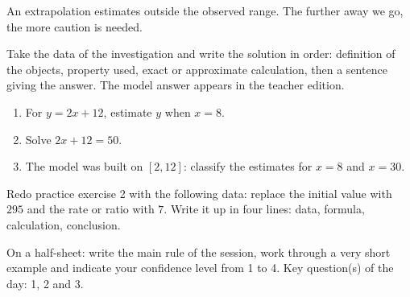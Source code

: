 \begin{traceecrite}An extrapolation estimates outside the observed range. The further away we go, the more caution is needed.\end{traceecrite}

\begin{exemple}
Take the data of the investigation and write the solution in order: definition of the objects, property used, exact or approximate calculation, then a sentence giving the answer. The model answer appears in the teacher edition.
\end{exemple}

\begin{exercice}[-- essential]
\begin{enumerate}\item For $y=2x+12$, estimate $y$ when $x=8$.\item Solve $2x+12=50$.\item The model was built on $[2,12]$: classify the estimates for $x=8$ and $x=30$.\end{enumerate}
\end{exercice}


\begin{dm}Redo practice exercise 2 with the following data: replace the initial value with $295$ and the rate or ratio with $7$. Write it up in four lines: data, formula, calculation, conclusion.\end{dm}

\begin{sortie}On a half-sheet: write the main rule of the session, work through a very short example and indicate your confidence level from 1 to 4. Key question(s) of the day: 1, 2 and 3.\end{sortie}

